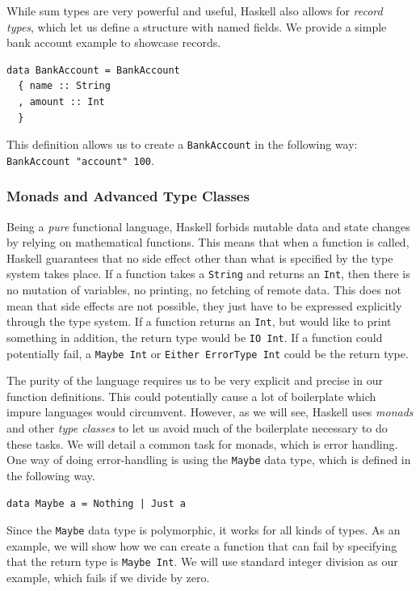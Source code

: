 \documentclass[a4paper,english]{ifimaster}
\begin{document}
While sum types are very powerful and useful, Haskell also allows for \textit{record types}, which let us define a structure with named fields. We provide a simple bank account example to showcase records.

\begin{verbatim}
data BankAccount = BankAccount
  { name :: String
  , amount :: Int
  }
\end{verbatim}

This definition allows us to create a \texttt{BankAccount} in the following way: \texttt{BankAccount "account" 100}.

\subsubsection{Monads and Advanced Type Classes}%
\label{ssub:monads_and_advanced_type_classes}

Being a \textit{pure} functional language, Haskell forbids mutable data and state changes by relying on mathematical functions. This means that when a function is called, Haskell guarantees that no side effect other than what is specified by the type system takes place. If a function takes a \texttt{String} and returns an \texttt{Int}, then there is no mutation of variables, no printing, no fetching of remote data. This does not mean that side effects are not possible, they just have to be expressed explicitly through the type system. If a function returns an \texttt{Int}, but would like to print something in addition, the return type would be \texttt{IO Int}. If a function could potentially fail, a \texttt{Maybe Int} or \texttt{Either ErrorType Int} could be the return type.

The purity of the language requires us to be very explicit and precise in our function definitions. This could potentially cause a lot of boilerplate which impure languages would circumvent. However, as we will see, Haskell uses \textit{monads} and other \textit{type classes} to let us avoid much of the boilerplate necessary to do these tasks. We will detail a common task for monads, which is error handling. One way of doing error-handling is using the \texttt{Maybe} data type, which is defined in the following way.

\begin{verbatim}
data Maybe a = Nothing | Just a
\end{verbatim}

Since the \texttt{Maybe} data type is polymorphic, it works for all kinds of types. As an example, we will show how we can create a function that can fail by specifying that the return type is \texttt{Maybe Int}. We will use standard integer division as our example, which fails if we divide by zero.
\end{document}
